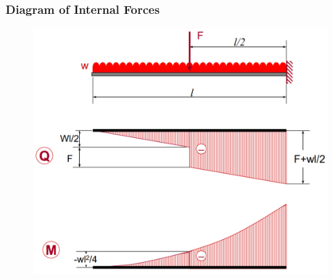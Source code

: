 \documentclass[class=report, crop=false, 12pt,a4paper]{standalone}
\begin{document}
\subsubsection{Diagram of Internal Forces}
\begin{figure}[H]
  \centering
  \includegraphics[width = 0.8 \textwidth]{../img/diagramofinternalforces.PNG}
\end{figure}
\end{document}
